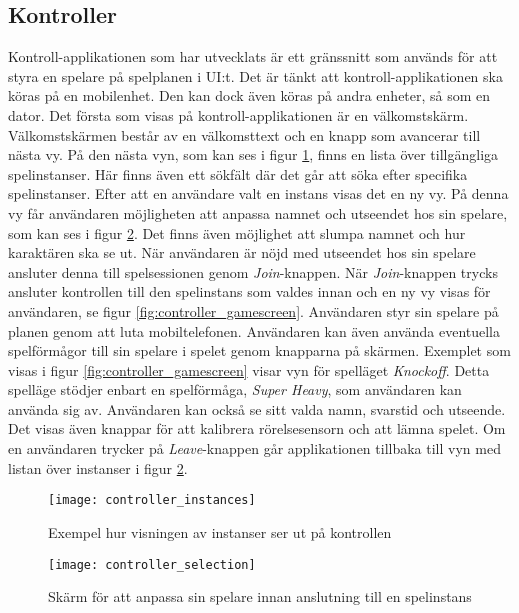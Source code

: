 \subsection{Kontroller}
Kontroll-applikationen som har utvecklats är ett gränssnitt som används för att styra en spelare på spelplanen i UI:t. Det är tänkt att kontroll-applikationen ska köras på en mobilenhet. Den kan dock även köras på andra enheter, så som en dator. Det första som visas på kontroll-applikationen är en välkomstskärm. Välkomstskärmen består av en välkomsttext och en knapp som avancerar till nästa vy. På den nästa vyn, som kan ses i figur \ref{fig:controller_instances}, finns en lista över tillgängliga spelinstanser. Här finns även ett sökfält där det går att söka efter specifika spelinstanser. Efter att en användare valt en instans visas det en ny vy. På denna vy får användaren möjligheten att anpassa namnet och utseendet hos sin spelare, som kan ses i figur \ref{fig:controller_selection}. Det finns även möjlighet att slumpa namnet och hur karaktären ska se ut. När användaren är nöjd med utseendet hos sin spelare ansluter denna till spelsessionen genom \textit{Join}-knappen. När \textit{Join}-knappen trycks ansluter kontrollen till den spelinstans som valdes innan och en ny vy visas för användaren, se figur \ref{fig:controller_gamescreen}. Användaren styr sin spelare på planen genom att luta mobiltelefonen. Användaren kan även använda eventuella spelförmågor till sin spelare i spelet genom knapparna på skärmen. Exemplet som visas i figur \ref{fig:controller_gamescreen} visar vyn för spelläget \textit{Knockoff}. Detta spelläge stödjer enbart en spelförmåga, \textit{Super Heavy}, som användaren kan använda sig av. Användaren kan också se sitt valda namn, svarstid och utseende. Det visas även knappar för att kalibrera rörelsesensorn och att lämna spelet. Om en användaren trycker på \textit{Leave}-knappen går applikationen tillbaka till vyn med listan över instanser i figur \ref{fig:controller_selection}.

\begin{figure}[h]
    \centering
    \texttt{[image: controller\_instances]}
    \caption{Exempel hur visningen av instanser ser ut på kontrollen}
    \label{fig:controller_instances}
\end{figure}

\begin{figure}[h]
    \centering
    \texttt{[image: controller\_selection]}
    \caption{Skärm för att anpassa sin spelare innan anslutning till en spelinstans}
    \label{fig:controller_selection}
\end{figure}

